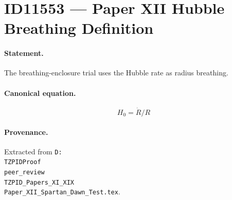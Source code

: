 \section*{ID11553 --- Paper XII Hubble Breathing Definition}

\paragraph{Statement.}
The breathing-enclosure trial uses the Hubble rate as radius breathing.

\paragraph{Canonical equation.}
\[
H_0=\dot R/R
\]

\paragraph{Provenance.}
Extracted from \texttt{D:\\TZPIDProof\\peer\_review\\TZPID\_Papers\_XI\_XIX\\Paper\_XII\_Spartan\_Dawn\_Test.tex}.
